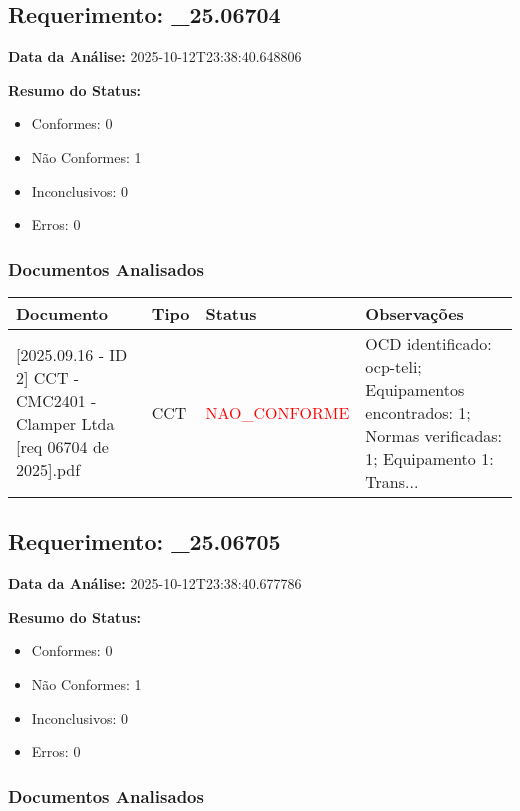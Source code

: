 \documentclass[12pt,a4paper]{article}
\begin{document}
\subsection{Requerimento: \_25.06704}

\textbf{Data da Análise:} 2025-10-12T23:38:40.648806

\textbf{Resumo do Status:}
\begin{itemize}
    \item Conformes: 0
    \item Não Conformes: 1
    \item Inconclusivos: 0
    \item Erros: 0
\end{itemize}

\subsubsection{Documentos Analisados}

\begin{longtable}{|p{4cm}|p{2cm}|p{2cm}|p{6cm}|}
\hline
\textbf{Documento} & \textbf{Tipo} & \textbf{Status} & \textbf{Observações} \\
\hline
\endhead
[Certificado de Conformidade Técnica - CCT][2025.09.16 - ID 2] CCT - CMC2401 - Clamper Ltda [req 06704 de  2025].pdf & CCT & \textcolor{red}{NAO\_CONFORME} & OCD identificado: ocp-teli; Equipamentos encontrados: 1; Normas verificadas: 1; Equipamento 1: Trans... \\
\hline
\end{longtable}


\subsection{Requerimento: \_25.06705}

\textbf{Data da Análise:} 2025-10-12T23:38:40.677786

\textbf{Resumo do Status:}
\begin{itemize}
    \item Conformes: 0
    \item Não Conformes: 1
    \item Inconclusivos: 0
    \item Erros: 0
\end{itemize}

\subsubsection{Documentos Analisados}
\end{document}
